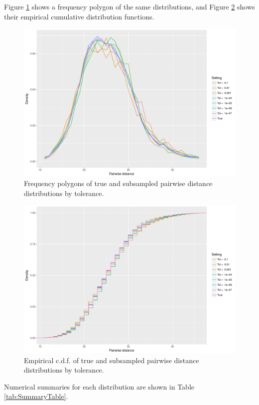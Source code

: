 \documentclass{article}
\begin{document}
Figure \ref{fig:FreqPoly} shows a frequency polygon of the same distributions, and Figure \ref{fig:ECDF} shows their empirical cumulative distribution functions.
\begin{figure}
    \includegraphics[width=\linewidth]{Figures/PairwiseDistance/freqpoly_by_tol.pdf}
    \caption{Frequency polygons of true and subsampled pairwise distance distributions by tolerance.}
    \label{fig:FreqPoly}
\end{figure}
\begin{figure}
    \includegraphics[width=\linewidth]{Figures/PairwiseDistance/ecdf_by_tol.pdf}
    \caption{Empirical c.d.f. of true and subsampled pairwise distance distributions by tolerance.}
    \label{fig:ECDF}
\end{figure}

Numerical summaries for each distribution are shown in Table \ref{tab:SummaryTable}.
\end{document}

